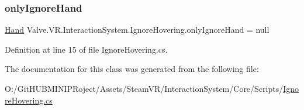 \subsubsection{\texorpdfstring{onlyIgnoreHand}{onlyIgnoreHand}}
{\footnotesize\ttfamily \mbox{\hyperlink{class_valve_1_1_v_r_1_1_interaction_system_1_1_hand}{Hand}} Valve.\+V\+R.\+Interaction\+System.\+Ignore\+Hovering.\+only\+Ignore\+Hand = null}



Definition at line 15 of file Ignore\+Hovering.\+cs.



The documentation for this class was generated from the following file\+:\begin{DoxyCompactItemize}
\item 
O\+:/\+Git\+H\+U\+B\+M\+I\+N\+I\+P\+Roject/\+Assets/\+Steam\+V\+R/\+Interaction\+System/\+Core/\+Scripts/\mbox{\hyperlink{_ignore_hovering_8cs}{Ignore\+Hovering.\+cs}}\end{DoxyCompactItemize}
